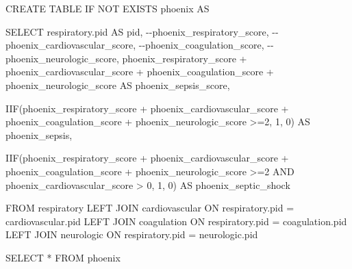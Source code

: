 \documentclass[
  letterpaper,
  DIV=11,
  numbers=noendperiod]{scrartcl}
\newenvironment{Shaded}{\begin{snugshade}}{\end{snugshade}}
\newcommand{\CommentTok}[1]{\textcolor[rgb]{0.37,0.37,0.37}{#1}}
\newcommand{\ControlFlowTok}[1]{\textcolor[rgb]{0.00,0.23,0.31}{#1}}
\newcommand{\DecValTok}[1]{\textcolor[rgb]{0.68,0.00,0.00}{#1}}
\newcommand{\KeywordTok}[1]{\textcolor[rgb]{0.00,0.23,0.31}{#1}}
\newcommand{\NormalTok}[1]{\textcolor[rgb]{0.00,0.23,0.31}{#1}}
\newcommand{\OperatorTok}[1]{\textcolor[rgb]{0.37,0.37,0.37}{#1}}
\begin{document}
\begin{Shaded}
\begin{Highlighting}[]
\KeywordTok{CREATE} \KeywordTok{TABLE} \ControlFlowTok{IF} \KeywordTok{NOT} \KeywordTok{EXISTS}\NormalTok{ phoenix }\KeywordTok{AS}

\KeywordTok{SELECT}
\NormalTok{  respiratory.pid }\KeywordTok{AS}\NormalTok{ pid,}
  \CommentTok{{-}{-}phoenix\_respiratory\_score,}
  \CommentTok{{-}{-}phoenix\_cardiovascular\_score,}
  \CommentTok{{-}{-}phoenix\_coagulation\_score,}
  \CommentTok{{-}{-}phoenix\_neurologic\_score,}
\NormalTok{  phoenix\_respiratory\_score }\OperatorTok{+}\NormalTok{ phoenix\_cardiovascular\_score }\OperatorTok{+}
\NormalTok{    phoenix\_coagulation\_score }\OperatorTok{+}\NormalTok{ phoenix\_neurologic\_score }\KeywordTok{AS}\NormalTok{ phoenix\_sepsis\_score,}

\NormalTok{  IIF(phoenix\_respiratory\_score }\OperatorTok{+}\NormalTok{ phoenix\_cardiovascular\_score }\OperatorTok{+}
\NormalTok{    phoenix\_coagulation\_score }\OperatorTok{+}\NormalTok{ phoenix\_neurologic\_score }\OperatorTok{\textgreater{}=}\DecValTok{2}\NormalTok{, }\DecValTok{1}\NormalTok{, }\DecValTok{0}\NormalTok{) }\KeywordTok{AS}\NormalTok{ phoenix\_sepsis,}

\NormalTok{  IIF(phoenix\_respiratory\_score }\OperatorTok{+}\NormalTok{ phoenix\_cardiovascular\_score }\OperatorTok{+}
\NormalTok{    phoenix\_coagulation\_score }\OperatorTok{+}\NormalTok{ phoenix\_neurologic\_score }\OperatorTok{\textgreater{}=}\DecValTok{2} \KeywordTok{AND}
\NormalTok{    phoenix\_cardiovascular\_score }\OperatorTok{\textgreater{}} \DecValTok{0}\NormalTok{, }\DecValTok{1}\NormalTok{, }\DecValTok{0}\NormalTok{) }\KeywordTok{AS}\NormalTok{ phoenix\_septic\_shock}

\KeywordTok{FROM}\NormalTok{ respiratory}
\KeywordTok{LEFT} \KeywordTok{JOIN}\NormalTok{ cardiovascular}
\KeywordTok{ON}\NormalTok{ respiratory.pid }\OperatorTok{=}\NormalTok{ cardiovascular.pid}
\KeywordTok{LEFT} \KeywordTok{JOIN}\NormalTok{ coagulation}
\KeywordTok{ON}\NormalTok{ respiratory.pid }\OperatorTok{=}\NormalTok{ coagulation.pid}
\KeywordTok{LEFT} \KeywordTok{JOIN}\NormalTok{ neurologic}
\KeywordTok{ON}\NormalTok{ respiratory.pid }\OperatorTok{=}\NormalTok{ neurologic.pid}
\end{Highlighting}
\end{Shaded}

\begin{Shaded}
\begin{Highlighting}[]
\KeywordTok{SELECT} \OperatorTok{*} \KeywordTok{FROM}\NormalTok{ phoenix}
\end{Highlighting}
\end{Shaded}
\end{document}
